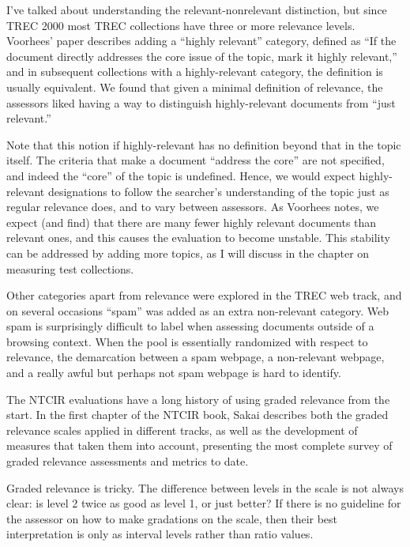 \documentclass[nobib]{tufte-book}
\begin{document}
I've talked about understanding the relevant-nonrelevant distinction, but since TREC 2000 most TREC collections have three or more relevance levels.  Voorhees' paper\autocite{voorhees_evaluation_2001} describes adding a ``highly relevant'' category, defined as ``If the document directly addresses the core issue of the topic, mark it highly relevant,'' and in subsequent collections with a highly-relevant category, the definition is usually equivalent.  We found that given a minimal definition of relevance, the assessors liked having a way to distinguish highly-relevant documents from ``just relevant.''

Note that this notion if highly-relevant has no definition beyond that in the topic itself.  The criteria that make a document ``address the core'' are not specified, and indeed the ``core'' of the topic is undefined.  Hence, we would expect highly-relevant designations to follow the searcher's understanding of the topic just as regular relevance does, and to vary between assessors.  As Voorhees notes, we expect (and find) that there are many fewer highly relevant documents than relevant ones, and this causes the evaluation to become unstable.  This stability can be addressed by adding more topics, as I will discuss in the chapter on measuring test collections.

Other categories apart from relevance were explored in the TREC web track, and on several occasions ``spam'' was added as an extra non-relevant category.  Web spam is surprisingly difficult to label when assessing documents outside of a browsing context.  When the pool is essentially randomized with respect to relevance, the demarcation between a spam webpage, a non-relevant webpage, and a really awful but perhaps not spam webpage is hard to identify.

The NTCIR evaluations have a long history of using graded relevance from the start.  In the first chapter of the NTCIR book\autocite[chapter 1]{sakai_evaluating_2020}, Sakai describes both the graded relevance scales applied in different tracks, as well as the development of measures that taken them into account, presenting the most complete survey of graded relevance assessments and metrics to date.

Graded relevance is tricky.  The difference between levels in the scale is not always clear: is level 2 twice as good as level 1, or just better?  If there is no guideline for the assessor on how to make gradations on the scale, then their best interpretation is only as interval levels rather than ratio values.
\end{document}
